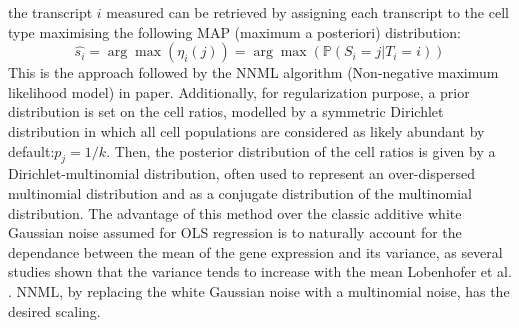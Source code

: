 the transcript \(i\) measured can be retrieved by assigning each
transcript to the cell type maximising the following MAP (maximum a
posteriori) distribution: \[
\hat{s_i} = \arg \max \left( \eta_{i}(j)\right) = \arg \max \left( \mathbb{P} (S_i=j | T_i =i) \right)
\] This is the approach followed by the NNML algorithm (Non-negative
maximum likelihood model) in \autocite{qiao_etal12} paper. Additionally, for regularization purpose,
a prior distribution is set on the cell ratios, modelled by a symmetric
Dirichlet distribution in which all cell populations are considered as
likely abundant by default:\(p_j=1/k\). Then, the posterior distribution
of the cell ratios is given by a Dirichlet-multinomial distribution,
often used to represent an over-dispersed multinomial distribution and
as a conjugate distribution of the multinomial distribution. The
advantage of this method over the classic additive white Gaussian noise
assumed for OLS regression is to naturally account for the dependance
between the mean of the gene expression and its variance, as several
studies shown that the variance tends to increase with the mean
Lobenhofer et al. \autocite{lobenhofer_etal08}.
\(\text{NNML}\), by replacing the white Gaussian noise with a
multinomial noise, has the desired scaling.


